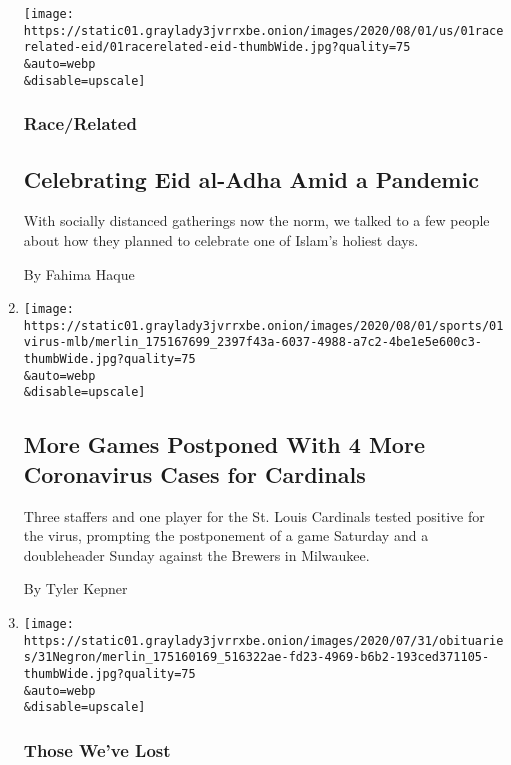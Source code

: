 \begin{enumerate}
  \texttt{[image: https://static01.graylady3jvrrxbe.onion/images/2020/08/01/us/01racerelated-eid/01racerelated-eid-thumbWide.jpg?quality=75\\\&auto=webp\\\&disable=upscale]}

  \hypertarget{racerelated}{%
  \subsubsection{Race/Related}\label{racerelated}}

  \hypertarget{celebrating-eid-al-adha-amid-a-pandemic}{%
  \subsection{Celebrating Eid al-Adha Amid a
  Pandemic}\label{celebrating-eid-al-adha-amid-a-pandemic}}

  With socially distanced gatherings now the norm, we talked to a few
  people about how they planned to celebrate one of Islam's holiest
  days.

  By Fahima Haque
\item
  \href{/2020/08/01/sports/baseball/coronavirus-cardinals.html}{}

  \texttt{[image: https://static01.graylady3jvrrxbe.onion/images/2020/08/01/sports/01virus-mlb/merlin\_175167699\_2397f43a-6037-4988-a7c2-4be1e5e600c3-thumbWide.jpg?quality=75\\\&auto=webp\\\&disable=upscale]}

  \hypertarget{more-games-postponed-with-4-more-coronavirus-cases-for-cardinals}{%
  \subsection{More Games Postponed With 4 More Coronavirus Cases for
  Cardinals}\label{more-games-postponed-with-4-more-coronavirus-cases-for-cardinals}}

  Three staffers and one player for the St. Louis Cardinals tested
  positive for the virus, prompting the postponement of a game Saturday
  and a doubleheader Sunday against the Brewers in Milwaukee.

  By Tyler Kepner
\item
  \href{/2020/08/01/obituaries/eddie-negron-dead-coronavirus.html}{}

  \texttt{[image: https://static01.graylady3jvrrxbe.onion/images/2020/07/31/obituaries/31Negron/merlin\_175160169\_516322ae-fd23-4969-b6b2-193ced371105-thumbWide.jpg?quality=75\\\&auto=webp\\\&disable=upscale]}

  \hypertarget{those-weve-lost-1}{%
  \subsubsection{Those We've Lost}\label{those-weve-lost-1}}


\end{enumerate}
